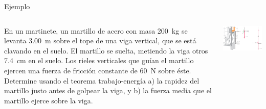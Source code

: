 \documentclass[9pt, aspectratio=169]{beamer}
\begin{document}
\begin{frame}{Ejemplo}
\begin{columns}
\cx
En un martinete, un martillo de acero con masa \qty{200}{kg} se levanta \qty{3.00}{m} sobre el tope de una viga vertical, que se está clavando en el suelo. El martillo se suelta, metiendo la viga otros \qty{7.4}{cm} en el suelo. Los rieles verticales que guían el martillo ejercen una fuerza de fricción constante de \qty{60}{N} sobre éste. Determine usando el teorema trabajo-energía a) la rapidez del martillo justo antes de golpear la viga, y b) la fuerza media que el martillo ejerce sobre la viga. 
\cx
\begin{center}
    \includegraphics[width=1.0\textwidth]{figs/fig-05.png}
\end{center}
\end{columns}
\end{frame}
\end{document}
